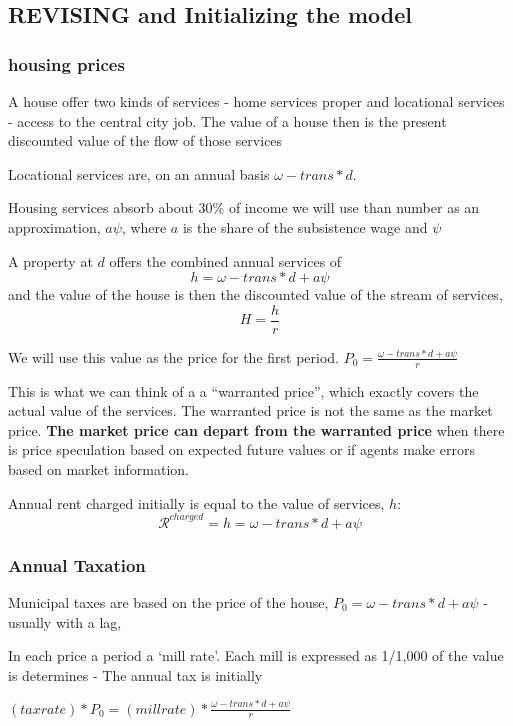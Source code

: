 \newcommand{\ee}[1]{\color{red}#1 \color{black}}

\subsection{REVISING and  Initializing the model}
\subsubsection{housing prices}

A house offer two kinds of services - home services proper and locational services - access to the central city job. The value of a house then is the present discounted value of the flow of those services

Locational services are, on an annual basis $\omega- trans * d$.

Housing services absorb about 30\% of income  we will use than number  as an approximation,  $a\psi$, where $a$ is the share of the subsistence wage and $\psi$


A property at $d$ offers the combined annual services of 
\[h=\omega- trans * d + a\psi\]
and the value of the house is then the discounted value of the stream of services,
\[H=\frac{h}{r}\]

We will use this value as the price for the first period. 
 $P_0=\frac{\omega- trans * d + a\psi}{r}$

This is what we can think of a a ``warranted price'', which exactly covers the actual value of the services. The warranted price  is not the same as the market price.  \textbf{The market price can depart from the warranted price} when there is price speculation based on expected future values or if agents make errors based on market information.

Annual rent charged initially is  equal to the value of services, $h$:
\[\mathcal R^{charged}= h= \omega- trans * d + a\psi\]



\subsubsection{Annual Taxation}
Municipal taxes are based on the price of the house, $P_0=\omega- trans * d + a\psi$ - usually with a lag, 

In each price a period a `mill rate'. Each mill is  expressed as  1/1,000 of the value is determines - The annual tax is initially

 $(taxrate)*P_0=(millrate)*\frac{\omega- trans * d + a\psi}{r}$

